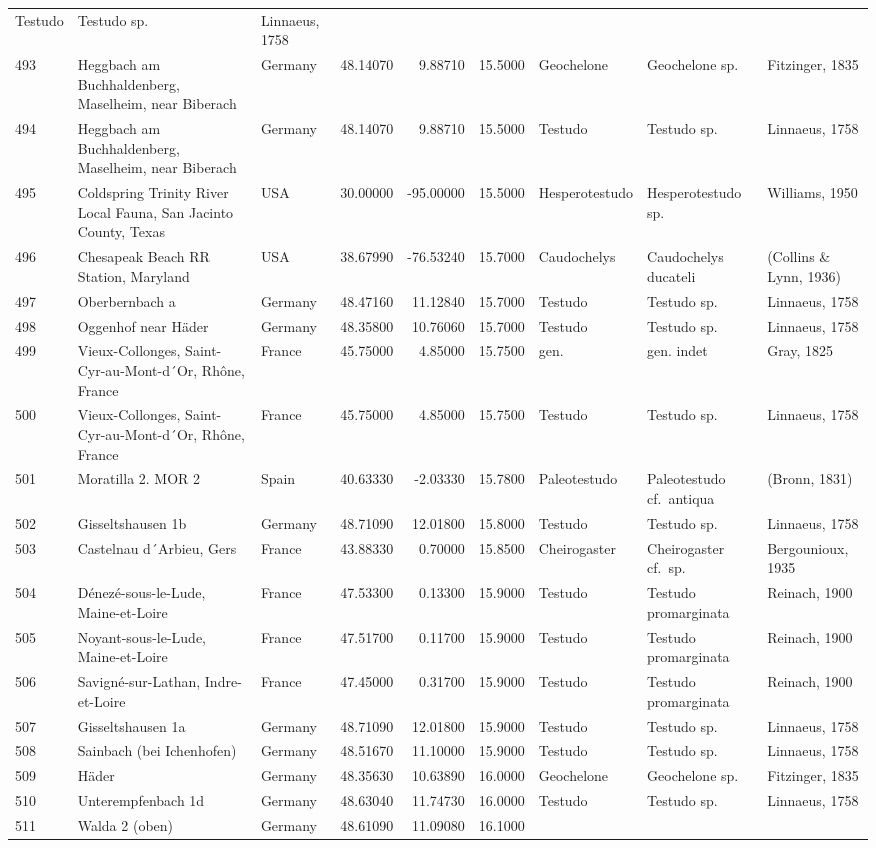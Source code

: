 \documentclass[]{article}
\begin{document}
\begin{longtable}[]{@{}lllrrrlll@{}}
Testudo & Testudo sp. & Linnaeus, 1758\tabularnewline
493 & Heggbach am Buchhaldenberg, Maselheim, near Biberach & Germany &
48.14070 & 9.88710 & 15.5000 & Geochelone & Geochelone sp. & Fitzinger,
1835\tabularnewline
494 & Heggbach am Buchhaldenberg, Maselheim, near Biberach & Germany &
48.14070 & 9.88710 & 15.5000 & Testudo & Testudo sp. & Linnaeus,
1758\tabularnewline
495 & Coldspring Trinity River Local Fauna, San Jacinto County, Texas &
USA & 30.00000 & -95.00000 & 15.5000 & Hesperotestudo & Hesperotestudo
sp. & Williams, 1950\tabularnewline
496 & Chesapeak Beach RR Station, Maryland & USA & 38.67990 & -76.53240
& 15.7000 & Caudochelys & Caudochelys ducateli & (Collins \& Lynn,
1936)\tabularnewline
497 & Oberbernbach a & Germany & 48.47160 & 11.12840 & 15.7000 & Testudo
& Testudo sp. & Linnaeus, 1758\tabularnewline
498 & Oggenhof near Häder & Germany & 48.35800 & 10.76060 & 15.7000 &
Testudo & Testudo sp. & Linnaeus, 1758\tabularnewline
499 & Vieux-Collonges, Saint-Cyr-au-Mont-d´Or, Rhône, France & France &
45.75000 & 4.85000 & 15.7500 & gen. & gen. indet & Gray,
1825\tabularnewline
500 & Vieux-Collonges, Saint-Cyr-au-Mont-d´Or, Rhône, France & France &
45.75000 & 4.85000 & 15.7500 & Testudo & Testudo sp. & Linnaeus,
1758\tabularnewline
501 & Moratilla 2. MOR 2 & Spain & 40.63330 & -2.03330 & 15.7800 &
Paleotestudo & Paleotestudo cf.~antiqua & (Bronn, 1831)\tabularnewline
502 & Gisseltshausen 1b & Germany & 48.71090 & 12.01800 & 15.8000 &
Testudo & Testudo sp. & Linnaeus, 1758\tabularnewline
503 & Castelnau d´Arbieu, Gers & France & 43.88330 & 0.70000 & 15.8500 &
Cheirogaster & Cheirogaster cf.~sp. & Bergounioux, 1935\tabularnewline
504 & Dénezé-sous-le-Lude, Maine-et-Loire & France & 47.53300 & 0.13300
& 15.9000 & Testudo & Testudo promarginata & Reinach,
1900\tabularnewline
505 & Noyant-sous-le-Lude, Maine-et-Loire & France & 47.51700 & 0.11700
& 15.9000 & Testudo & Testudo promarginata & Reinach,
1900\tabularnewline
506 & Savigné-sur-Lathan, Indre-et-Loire & France & 47.45000 & 0.31700 &
15.9000 & Testudo & Testudo promarginata & Reinach, 1900\tabularnewline
507 & Gisseltshausen 1a & Germany & 48.71090 & 12.01800 & 15.9000 &
Testudo & Testudo sp. & Linnaeus, 1758\tabularnewline
508 & Sainbach (bei Ichenhofen) & Germany & 48.51670 & 11.10000 &
15.9000 & Testudo & Testudo sp. & Linnaeus, 1758\tabularnewline
509 & Häder & Germany & 48.35630 & 10.63890 & 16.0000 & Geochelone &
Geochelone sp. & Fitzinger, 1835\tabularnewline
510 & Unterempfenbach 1d & Germany & 48.63040 & 11.74730 & 16.0000 &
Testudo & Testudo sp. & Linnaeus, 1758\tabularnewline
511 & Walda 2 (oben) & Germany & 48.61090 & 11.09080 & 16.1000 &

\end{longtable}
\end{document}
